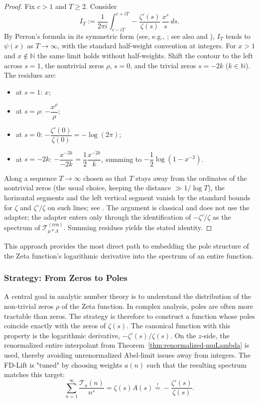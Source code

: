 \begin{proof}
Fix $c>1$ and $T\ge2$. Consider
\[
I_T:=\frac{1}{2\pi i}\int_{c-iT}^{c+iT} -\frac{\zeta'(s)}{\zeta(s)}\,\frac{x^{s}}{s}\,ds.
\]
By Perron's formula in its symmetric form (see, e.g., \cite[Thms.\ 4.11 and 4.16]{titchmarsh1986}; see also \cite[Ch.\ 3]{edwards2001} and \cite{iwanieckowalski2021}), $I_T$ tends to $\psi(x)$ as $T\to\infty$, with the standard half-weight convention at integers. For $x>1$ and $x\notin\mathbb N$ the same limit holds without half-weights. Shift the contour to the left across $s=1$, the nontrivial zeros $\rho$, $s=0$, and the trivial zeros $s=-2k$ ($k\in\mathbb{N}$). The residues are:
\begin{itemize}
\item at $s=1$: $x$;
\item at $s=\rho$: $-\dfrac{x^{\rho}}{\rho}$;
\item at $s=0$: $-\dfrac{\zeta'(0)}{\zeta(0)}=-\log(2\pi)$;
\item at $s=-2k$: $-\dfrac{x^{-2k}}{-2k}=\dfrac{1}{2}\dfrac{x^{-2k}}{k}$, summing to $-\dfrac{1}{2}\log(1-x^{-2})$.
\end{itemize}
Along a sequence $T\to\infty$ chosen so that $T$ stays away from the ordinates of the nontrivial zeros (the usual choice, keeping the distance $\gg1/\log T$), the horizontal segments and the left vertical segment vanish by the standard bounds for $\zeta$ and $\zeta'/\zeta$ on such lines; see \cite{edwards2001,titchmarsh1986,iwanieckowalski2021}. The argument is classical and does not use the adapter; the adapter enters only through the identification of $-\zeta'/\zeta$ as the spectrum of $\mathcal T^{(\mathrm{ren})}_{\mu*\Lambda}$. Summing residues yields the stated identity.
\end{proof}

This approach provides the most direct path to embedding the pole structure of the Zeta function's logarithmic derivative into the spectrum of an entire function.

\subsubsection{Strategy: From Zeros to Poles}
A central goal in analytic number theory is to understand the distribution of the non-trivial zeros $\rho$ of the Zeta function. In complex analysis, poles are often more tractable than zeros. The strategy is therefore to construct a function whose poles coincide exactly with the zeros of $\zeta(s)$. The canonical function with this property is the logarithmic derivative, $-\zeta'(s)/\zeta(s)$. On the $z$-side, the renormalized entire interpolant from Theorem~\ref{thm:renormalized-muLambda} is used, thereby avoiding unrenormalized Abel-limit issues away from integers.
The FD-Lift is "tuned" by choosing weights $a(n)$ such that the resulting spectrum matches this target:
\[
\sum_{n=1}^{\infty}\frac{\mathcal T_a(n)}{n^s} = \zeta(s) A(s) \stackrel{!}{=} -\frac{\zeta'(s)}{\zeta(s)}.
\]

